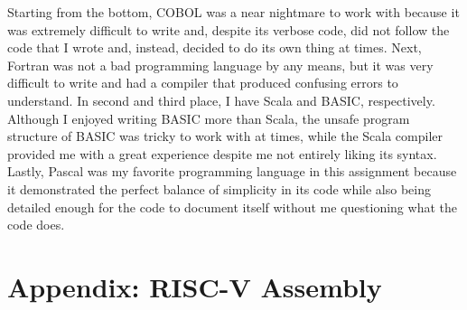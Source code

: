 \documentclass[letterpaper, 10pt, DIV=13]{scrartcl}
\numberwithin{equation}{section}
\numberwithin{figure}{section}
\numberwithin{table}{section}
\begin{document}
Starting from the bottom, COBOL was a near nightmare to work with because it was extremely difficult to write and, despite its verbose code, did not follow the code that I wrote and, instead, decided to do its own thing at times. Next, Fortran was not a bad programming language by any means, but it was very difficult to write and had a compiler that produced confusing errors to understand. In second and third place, I have Scala and BASIC, respectively. Although I enjoyed writing BASIC more than Scala, the unsafe program structure of BASIC was tricky to work with at times, while the Scala compiler provided me with a great experience despite me not entirely liking its syntax. Lastly, Pascal was my favorite programming language in this assignment because it demonstrated the perfect balance of simplicity in its code while also being detailed enough for the code to document itself without me questioning what the code does.

\section{Appendix: RISC-V Assembly}
\end{document}
